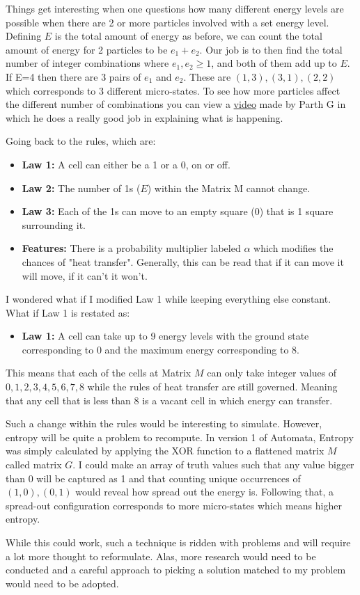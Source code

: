 \vspace{0.3cm}
Things get interesting when one questions how many different energy levels are possible when there are 2 or more particles involved with a set energy level. Defining $E$ is the total amount of energy as before, we can count the total amount of energy for 2 particles to be $e_{1}+e_{2}$. Our job is to then find the total number of integer combinations where $e_{1},e_{2} \ge 1$, and both of them add up to $E$. If E=4 then there are 3 pairs of $e_{1}$ and $e_{2}$. These are $(1,3), (3,1), (2,2) $ which corresponds to 3 different micro-states. To see how more particles affect the different number of combinations you can view a \href{https://www.youtube.com/watch?v=mg0hueOyoAw}{video} made by Parth G in which he does a really good job in explaining what is happening. \par

\vspace{0.3cm}
Going back to the rules, which are: 
\begin{itemize}
    \item \textbf{Law 1: }A cell can either be a 1 or a 0, on or off.
    \item \textbf{Law 2: }The number of 1s ($E$) within the Matrix M cannot change.
    \item \textbf{Law 3: }Each of the 1s can move to an empty square (0) that is 1 square surrounding it.
    \item \textbf{Features: }There is a probability multiplier labeled $\alpha$ which modifies the chances of "heat transfer". Generally, this can be read that if it can move it will move, if it can't it won't. 
\end{itemize}
I wondered what if I modified Law 1 while keeping everything else constant. What if Law 1 is restated as: 
\begin{itemize}
    \item \textbf{Law 1: }A cell can take up to 9 energy levels with the ground state corresponding to 0 and the maximum energy corresponding to 8.
\end{itemize}
This means that each of the cells at Matrix $M$ can only take integer values of $0,1,2,3,4,5,6,7,8$ while the rules of heat transfer are still governed. Meaning that any cell that is less than 8 is a vacant cell in which energy can transfer. \par

\vspace{0.3cm}
Such a change within the rules would be interesting to simulate. However, entropy will be quite a problem to recompute. In version 1 of Automata, Entropy was simply calculated by applying the XOR function to a flattened matrix $M$ called matrix $G$. I could make an array of truth values such that any value bigger than 0 will be captured as 1 and that counting unique occurrences of $(1,0), (0,1)$ would reveal how spread out the energy is. Following that, a spread-out configuration corresponds to more micro-states which means higher entropy. \par

\vspace{0.3cm}
While this could work, such a technique is ridden with problems and will require a lot more thought to reformulate. Alas, more research would need to be conducted and a careful approach to picking a solution matched to my problem would need to be adopted. 
